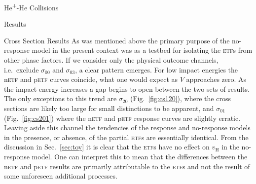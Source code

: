 \documentclass[letterpaper, 11 pt]{report}
\begin{document}
\begin{chapter}{\texorpdfstring{He\textsuperscript{+}}{He+}-He Collisions \label{chap:hephe}}
\begin{section}{Results \label{sec:hephe-disc}}
\begin{subsection}{Cross Section Results \label{sec:hephe-res}}
         As was mentioned above the primary purpose of the no-response model in the present context was
         as a testbed for isolating the \textsc{etf}s from other phase factors. If we consider only the
         physical outcome channels, i.e.\ exclude $\sigma_{00}$ and $\sigma_{03}$, a clear pattern
         emerges. For low impact energies the n\textsc{etf} and p\textsc{etf} curves coincide, what one
         would expect as $V$ approaches zero. As the impact energy increases a gap begins to open
         between the two sets of results. The only exceptions to this trend are $\sigma_{20}$
         (Fig.~\ref{fig:cs120}), where the cross sections are likely too large for small distinctions to
         be apparent, and $\sigma_{01}$ (Fig.~\ref{fig:cs201}) where the n\textsc{etf} and p\textsc{etf}
         response curves are slightly erratic. Leaving aside this channel the tendencies of the response
         and no-response models in the presence, or absence, of the partial \textsc{etf}s are
         essentially identical. From the discussion in Sec.~\ref{sec:toy} it is clear that the
         \textsc{etf}s have no effect on $v_\mathrm{H}$ in the no-response model. One can interpret this
         to mean that the differences between the n\textsc{etf} and p\textsc{etf} results are primarily
         attributable to the \textsc{etf}s and not the result of some unforeseen additional processes.


\end{subsection}
\end{section}
\end{chapter}
\end{document}
